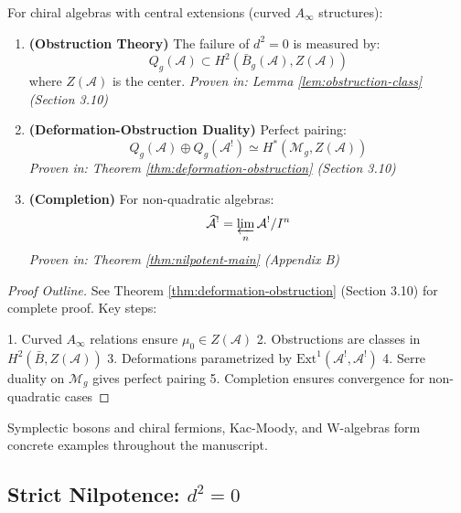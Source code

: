 \begin{maintheorem}\label{mainthm:curved-complete}
For chiral algebras with central extensions (curved $A_\infty$ structures):

\begin{enumerate}
\item \textbf{(Obstruction Theory)} The failure of $d^2 = 0$ is measured by:
$$Q_g(\mathcal{A}) \subset H^2(\bar{B}_g(\mathcal{A}), Z(\mathcal{A}))$$
where $Z(\mathcal{A})$ is the center.
\textit{Proven in: Lemma \ref{lem:obstruction-class} (Section 3.10)}

\item \textbf{(Deformation-Obstruction Duality)} Perfect pairing:
$$Q_g(\mathcal{A}) \oplus Q_g(\mathcal{A}^!) \simeq H^*(\mathcal{M}_g, Z(\mathcal{A}))$$
\textit{Proven in: Theorem \ref{thm:deformation-obstruction} (Section 3.10)}

\item \textbf{(Completion)} For non-quadratic algebras:
$$\widehat{\mathcal{A}}^! = \varprojlim_n \mathcal{A}^! / I^n$$
\textit{Proven in: Theorem \ref{thm:nilpotent-main} (Appendix B)}

\end{enumerate}
\end{maintheorem}

\begin{proof}[Proof Outline]
See Theorem \ref{thm:deformation-obstruction} (Section 3.10) for complete proof. 
Key steps:

1. Curved $A_\infty$ relations ensure $\mu_0 \in Z(\mathcal{A})$
2. Obstructions are classes in $H^2(\bar{B}, Z(\mathcal{A}))$
3. Deformations parametrized by $\text{Ext}^1(\mathcal{A}^!, \mathcal{A}^!)$
4. Serre duality on $\mathcal{M}_g$ gives perfect pairing
5. Completion ensures convergence for non-quadratic cases
\end{proof}

Symplectic bosons and chiral fermions, Kac-Moody, and W-algebras form concrete examples throughout the manuscript.



\subsection{Strict Nilpotence: $d^2 = 0$}

